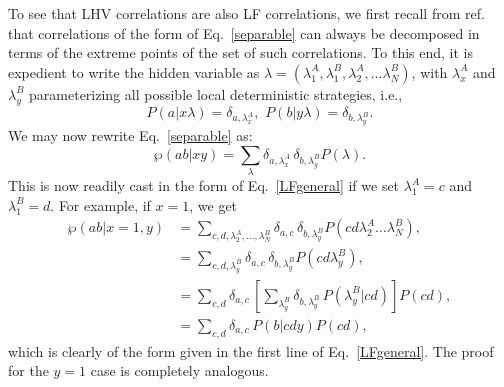 \documentclass[aps,prx,twocolumn,superscriptaddress]{revtex4-1}
\theoremstyle{plain}
\newcommand{\ie}{i.e.}
\begin{document}
To see that LHV correlations are also LF correlations, we first recall from ref.~\cite{BrunnerRMP} that correlations of the form of Eq.~\eqref{separable} can always be decomposed in terms of the extreme points of the set of such correlations. To this end, it is expedient to write the hidden variable as $\lambda=(\lambda^A_{1},\lambda^B_{1},\lambda^A_{2},\ldots \lambda^B_{N})$, with $\lambda^A_{x}$ and $\lambda^B_{y}$ parameterizing all possible local deterministic strategies, \ie, 
\begin{equation}
\label{determinisim}
	P(a|x\lambda)=\delta_{a,\lambda^A_{x}},\,\,
	P(b|y\lambda)=\delta_{b,\lambda^B_{y}}.
\end{equation}
We may now rewrite Eq.~\eqref{separable} as:
\begin{equation}
\label{decomposition}
	\wp(ab|xy)=\sum_{\lambda} \delta_{a,\lambda^A_{x}}\,\delta_{b,\lambda^B_{y}} P(\lambda).
\end{equation}
This is now readily cast in the form of Eq.~\eqref{LFgeneral} if we set $\lambda^A_{1}=c$ and $\lambda^B_{1}=d$. For example, if $x=1$, we get
\begin{equation}
\begin{split}
	\wp(ab|x=1,y)&=\sum_{c,d,\lambda^A_2,\ldots,\lambda^B_N} \delta_{a,c}\,\delta_{b,\lambda^B_{y}} P(cd\lambda^A_2\ldots\lambda^B_N),\\
		     &=\sum_{c,d,\lambda^B_y} \delta_{a,c}\,\delta_{b,\lambda^B_{y}} P(cd\lambda^B_y),\\
		     &=\sum_{c,d} \delta_{a,c}\,\left[\sum_{\lambda^B_y} \delta_{b,\lambda^B_{y}} \,P(\lambda^B_{y}|cd)\right] P(cd),\\
		     &=\sum_{c,d} \delta_{a,c}\,P(b|cdy) P(cd),
\end{split}
\end{equation}
which is clearly of the form given in the first line of Eq.~\eqref{LFgeneral}. The proof for the $y=1$ case is completely analogous. 
\end{document}

